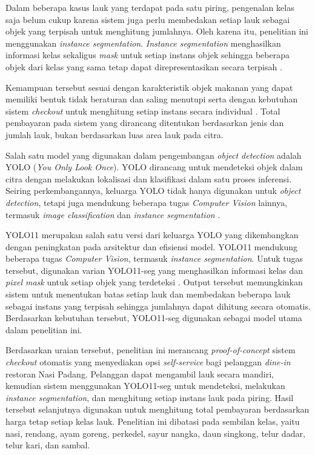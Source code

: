 Dalam beberapa kasus lauk yang terdapat pada satu piring, pengenalan kelas
saja belum cukup karena sistem juga perlu membedakan setiap lauk sebagai
objek yang terpisah untuk menghitung jumlahnya. Oleh karena itu, penelitian
ini menggunakan \textit{instance segmentation}. \textit{Instance segmentation}
menghasilkan informasi kelas sekaligus \textit{mask} untuk setiap instans
objek sehingga beberapa objek dari kelas yang sama tetap dapat
direpresentasikan secara terpisah \cite{he2017maskrcnn}.

Kemampuan tersebut sesuai dengan karakteristik objek makanan yang dapat
memiliki bentuk tidak beraturan dan saling menutupi serta dengan kebutuhan
sistem \textit{checkout} untuk menghitung setiap instans secara individual
\cite{guo2023,nguyen2022sibnet,nguyen2023foodmask}. Total pembayaran pada
sistem yang dirancang ditentukan berdasarkan jenis dan jumlah lauk, bukan
berdasarkan luas area lauk pada citra.

Salah satu model yang digunakan dalam pengembangan \textit{object detection} adalah YOLO (\textit{You Only Look Once}). YOLO dirancang untuk mendeteksi objek dalam citra dengan melakukan lokalisasi dan klasifikasi dalam satu proses inferensi. Seiring perkembangannya, keluarga YOLO tidak hanya digunakan untuk \textit{object detection}, tetapi juga mendukung beberapa tugas \textit{Computer Vision} lainnya, termasuk \textit{image classification} dan \textit{instance segmentation} \cite{khanam2024}.

YOLO11 merupakan salah satu versi dari keluarga YOLO yang dikembangkan dengan peningkatan pada arsitektur dan efisiensi model. YOLO11 mendukung beberapa tugas \textit{Computer Vision}, termasuk \textit{instance segmentation}. Untuk tugas tersebut, digunakan varian YOLO11-seg yang menghasilkan informasi kelas dan \textit{pixel mask} untuk setiap objek yang terdeteksi \cite{khanam2024,qiu2025}. Output tersebut memungkinkan sistem untuk menentukan batas setiap lauk dan membedakan beberapa lauk sebagai instans yang terpisah sehingga jumlahnya dapat dihitung secara otomatis. Berdasarkan kebutuhan tersebut, YOLO11-seg digunakan sebagai model utama dalam penelitian ini.

Berdasarkan uraian tersebut, penelitian ini merancang \textit{proof-of-concept} sistem \textit{checkout} otomatis yang menyediakan opsi \textit{self-service} bagi pelanggan \textit{dine-in} restoran Nasi Padang. Pelanggan dapat mengambil lauk secara mandiri, kemudian sistem menggunakan YOLO11-seg untuk mendeteksi, melakukan \textit{instance segmentation}, dan menghitung setiap instans lauk pada piring. Hasil tersebut selanjutnya digunakan untuk menghitung total pembayaran berdasarkan harga tetap setiap kelas lauk. Penelitian ini dibatasi pada sembilan kelas, yaitu nasi, rendang, ayam goreng, perkedel, sayur nangka, daun singkong, telur dadar, telur kari, dan sambal.

